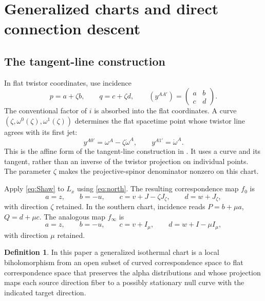 \documentclass[11pt]{article}
\numberwithin{equation}{section}
\theoremstyle{definition}
\newtheorem{definition}[theorem]{Definition}
\theoremstyle{remark}
\begin{document}
\section{Generalized charts and direct connection descent}

\subsection{The tangent-line construction}

In flat twistor coordinates, use incidence
\begin{equation}\label{eq:flatincidence}
p=a+\zeta b,\qquad q=c+\zeta d,
\qquad
(y^{AA'})=\begin{pmatrix}a&b\\c&d\end{pmatrix}.
\end{equation}
The conventional factor of $i$ is absorbed into the flat coordinates. A curve $(\zeta,\omega^0(\zeta),\omega^1(\zeta))$ determines the flat spacetime point whose twistor line agrees with its first jet:
\begin{equation}\label{eq:Shaw}
y^{A0'}=\omega^A-\zeta\dot\omega^A,
\qquad y^{A1'}=\dot\omega^A.
\end{equation}
This is the affine form of the tangent-line construction in \cite{Shaw}. It uses a curve and its tangent, rather than an inverse of the twistor projection on individual points. The parameter $\zeta$ makes the projective-spinor denominator nonzero on this chart.

Apply \eqref{eq:Shaw} to $L_x$ using \eqref{eq:north}. The resulting correspondence map $f_0$ is
\begin{equation}\label{eq:f0}
a=z,\qquad b=-u,\qquad
c=v+J-\zeta J_\zeta,\qquad d=w+J_\zeta,
\end{equation}
with direction $\zeta$ retained. In the southern chart, incidence reads $P=b+\mu a$, $Q=d+\mu c$. The analogous map $f_\infty$ is
\begin{equation}\label{eq:finfty}
a=z,\qquad b=-u,\qquad
c=v+I_\mu,\qquad d=w+I-\mu I_\mu,
\end{equation}
with direction $\mu$ retained.

\begin{definition}\label{def:genchart}
In this paper a generalized isothermal chart is a local biholomorphism from an open subset of curved correspondence space to flat correspondence space that preserves the alpha distributions and whose projection maps each source direction fiber to a possibly stationary null curve with the indicated target direction.
\end{definition}
\end{document}
